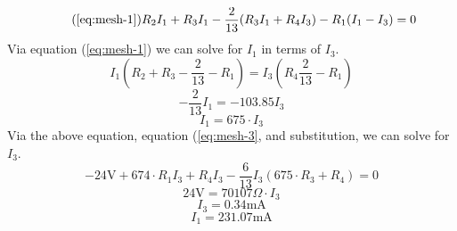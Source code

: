 \documentclass{article}
\begin{document}
	\begin{equation}\tag{\ref{eq:mesh-1}}
		R_2I_1 + R_3I_1-\frac{2}{13}(R_3I_1 + R_4I_3) - R_1(I_1-I_3) = 0
	\end{equation}
	Via equation (\ref{eq:mesh-1}) we can solve for $I_1$ in terms of $I_3$.
	$$ I_1\left(R_2+R_3-\frac{2}{13}-R_1 \right)=I_3 \left( R_4 
	\frac{2}{13}-R_1\right)$$
	$$ -\frac{2}{13}I_1 = -103.85I_3$$
	\begin{equation}\label{eq:mesh_1-in-mesh_3}
		I_1 = 675 \cdot I_3
	\end{equation}
	Via the above equation, equation (\ref{eq:mesh-3}, and substitution, we can 
	solve for $I_3$.
	$$ -24\text{V} + 674\cdot R_1I_3 + R_4I_3 - \frac{6}{13}I_3(675\cdot 
	R_3+R_4)=0$$
	$$ 24\text{V} = 70107 \Omega \cdot I_3$$
	\begin{equation}\label{eq:meshcur_3}
		I_3 = 0.34\text{mA}
	\end{equation}
	\begin{equation}\label{eq:meshcur_1}
		I_1 = 231.07\text{mA}
	\end{equation}
\end{document}
